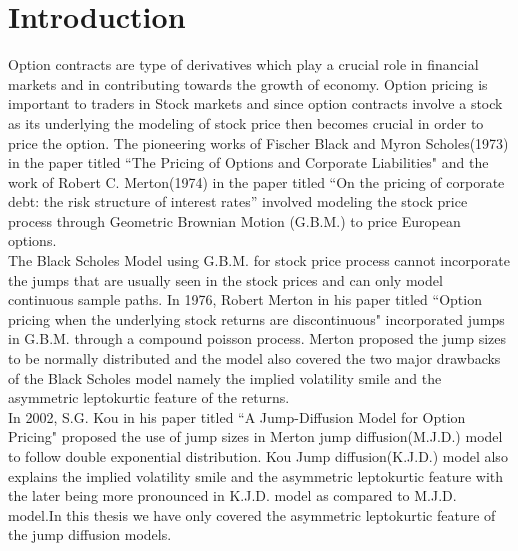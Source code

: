 \documentclass[12pt]{report}
\begin{document}
\chapter{Introduction}
Option contracts are type of derivatives which play a crucial role in financial markets and in contributing towards the growth of economy. Option pricing is important to traders in Stock markets and since option contracts involve a stock as its underlying the modeling of stock price then becomes crucial in order to price the option. The pioneering works of Fischer Black and Myron Scholes(1973) in the paper titled “The Pricing of Options and Corporate
Liabilities"\cite{black_scholes_1973} and the work of Robert C. Merton(1974) in the paper titled “On the pricing of
corporate debt: the risk structure of interest rates”\cite{merton_1974} involved modeling the stock price process through Geometric Brownian Motion (G.B.M.) to price European options.\\
The Black Scholes Model using G.B.M. for stock price process cannot incorporate the jumps that are usually seen in the stock prices and can only model continuous sample paths. In  1976, Robert Merton in his paper titled “Option pricing when the underlying stock returns are discontinuous"\cite{merton_1976} incorporated jumps in G.B.M. through a compound poisson process. Merton proposed the jump sizes to be normally distributed and the model also covered the two major drawbacks of the Black Scholes model namely the implied volatility smile and the asymmetric leptokurtic feature of the returns.\\
In 2002, S.G. Kou in his paper titled “A Jump-Diffusion Model
for Option Pricing"\cite{kou_2002} proposed the use of jump sizes in Merton jump diffusion(M.J.D.) model to follow double exponential distribution. Kou Jump diffusion(K.J.D.) model also explains the implied volatility smile and the asymmetric leptokurtic feature with the later being more pronounced in K.J.D. model as compared to M.J.D. model.In this thesis we have only covered the asymmetric leptokurtic feature of the jump diffusion models. 
\end{document}
